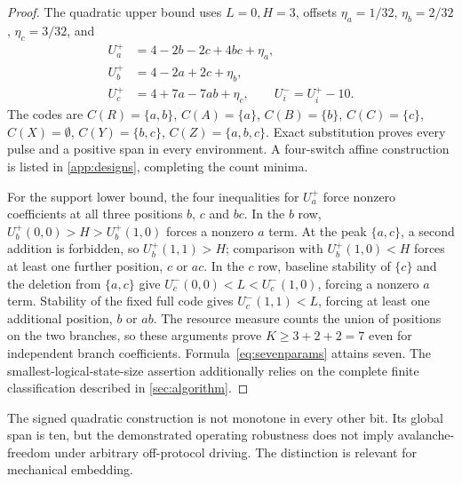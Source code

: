 \documentclass[12pt,letterpaper]{article}
\theoremstyle{definition}\newtheorem{definition}[theorem]{Definition}
\theoremstyle{remark}\newtheorem{remark}[theorem]{Remark}
\begin{document}
\begin{proof}
The quadratic upper bound uses $L=0,H=3$, offsets $\eta_a=1/32$, $\eta_b=2/32$, $\eta_c=3/32$, and
\begin{align}\label{eq:sevenparams}
 U_a^+&=4-2b-2c+4bc+\eta_a,\\
 U_b^+&=4-2a+2c+\eta_b,\\
 U_c^+&=4+7a-7ab+\eta_c,\qquad U_i^-=U_i^+-10.\nonumber
\end{align}
The codes are $C(R)=\{a,b\}$, $C(A)=\{a\}$, $C(B)=\{b\}$, $C(C)=\{c\}$, $C(X)=\emptyset$, $C(Y)=\{b,c\}$, $C(Z)=\{a,b,c\}$. Exact substitution proves every pulse and a positive span in every environment. A four-switch affine construction is listed in \cref{app:designs}, completing the count minima.

For the support lower bound, the four inequalities for $U_a^+$ force nonzero coefficients at all three positions $b$, $c$ and $bc$. In the $b$ row, $U_b^+(0,0)>H>U_b^+(1,0)$ forces a nonzero $a$ term. At the peak $\{a,c\}$, a second addition is forbidden, so $U_b^+(1,1)>H$; comparison with $U_b^+(1,0)<H$ forces at least one further position, $c$ or $ac$. In the $c$ row, baseline stability of $\{c\}$ and the deletion from $\{a,c\}$ give $U_c^-(0,0)<L<U_c^-(1,0)$, forcing a nonzero $a$ term. Stability of the fixed full code gives $U_c^-(1,1)<L$, forcing at least one additional position, $b$ or $ab$. The resource measure counts the union of positions on the two branches, so these arguments prove $K\ge3+2+2=7$ even for independent branch coefficients. Formula~\eqref{eq:sevenparams} attains seven. The smallest-logical-state-size assertion additionally relies on the complete finite classification described in \cref{sec:algorithm}.
\end{proof}

The signed quadratic construction is not monotone in every other bit. Its global span is ten, but the demonstrated operating robustness does not imply avalanche-freedom under arbitrary off-protocol driving. The distinction is relevant for mechanical embedding.
\end{document}
